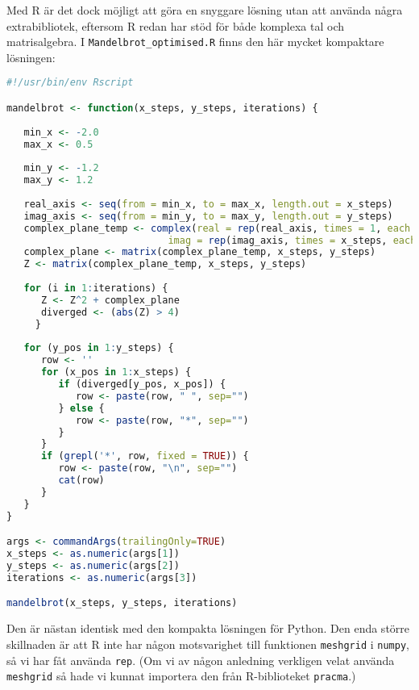 \documentclass[10pt, twoside,a4paper]{article}
\begin{document}
Med R är det dock möjligt att göra en snyggare lösning utan att använda några extrabibliotek, eftersom R redan har stöd för både komplexa tal och matrisalgebra. I \verb+Mandelbrot_optimised.R+ finns den här mycket kompaktare lösningen:
\begin{lstlisting}[language=R]
#!/usr/bin/env Rscript

mandelbrot <- function(x_steps, y_steps, iterations) {
   
   min_x <- -2.0
   max_x <- 0.5
   
   min_y <- -1.2
   max_y <- 1.2
   
   real_axis <- seq(from = min_x, to = max_x, length.out = x_steps)
   imag_axis <- seq(from = min_y, to = max_y, length.out = y_steps)
   complex_plane_temp <- complex(real = rep(real_axis, times = 1, each = y_steps),
                            imag = rep(imag_axis, times = x_steps, each = 1))
   complex_plane <- matrix(complex_plane_temp, x_steps, y_steps)
   Z <- matrix(complex_plane_temp, x_steps, y_steps)
   
   for (i in 1:iterations) { 
      Z <- Z^2 + complex_plane
      diverged <- (abs(Z) > 4)
     }
   
   for (y_pos in 1:y_steps) {
      row <- ''
      for (x_pos in 1:x_steps) {
         if (diverged[y_pos, x_pos]) {
            row <- paste(row, " ", sep="")
         } else {
            row <- paste(row, "*", sep="")
         }
      }
      if (grepl('*', row, fixed = TRUE)) {
         row <- paste(row, "\n", sep="")
         cat(row)
      }
   }
}

args <- commandArgs(trailingOnly=TRUE)
x_steps <- as.numeric(args[1])
y_steps <- as.numeric(args[2])
iterations <- as.numeric(args[3])

mandelbrot(x_steps, y_steps, iterations)
\end{lstlisting}
Den är nästan identisk med den kompakta lösningen för Python. Den enda större skillnaden är att R inte har någon motsvarighet till funktionen \verb+meshgrid+ i \verb+numpy+, så vi har fåt använda \verb+rep+. (Om vi av någon anledning verkligen velat använda \verb+meshgrid+ så hade vi kunnat importera den från R-biblioteket \verb+pracma+.)


\newpage
\end{document}
